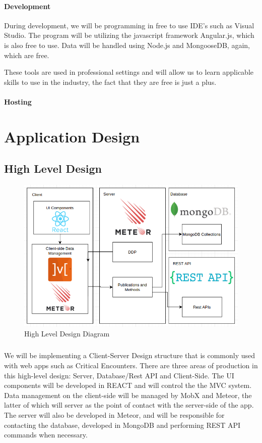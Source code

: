 \documentclass[12pt,a4paper]{report}
\begin{document}
		\subsubsection{Development}
		During development, we will be programming in free to use IDE's such as Visual Studio. The program will be utilizing the javascript framework Angular.js, which is also free to use. Data will be handled using Node.js and MongooseDB, again, which are free. 
		
		These tools are used in professional settings and will allow us to learn applicable skills to use in the industry, the fact that they are free is just a plus.
		\subsubsection{Hosting}
	
\newpage
\chapter*{Application Design}
	\section {High Level Design}
		\begin{figure}[h]
			\includegraphics[scale=.5]{designsd.png}
			\caption{High Level Design Diagram}
			\label{fig: High Level Design}
		\end{figure}
		
		\paragraph{}We will be implementing a Client-Server Design structure that is commonly used with web apps such as Critical Encounters. There are three areas of production in this high-level design: Server, Database/Rest API and Client-Side. The UI components will be developed in REACT and will control the the MVC system. Data management on the client-side will be managed by MobX and Meteor, the latter of which will server as the point of contact with the server-side of the app. The server will also be developed in Meteor, and will be responsible for contacting the database, developed in MongoDB and performing REST API commands when necessary. 
		
\end{document}
